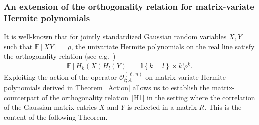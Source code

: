 \documentclass[AHL,Unicode,longabstracts,published]{cedram}
\newcommand{\clO}{\mathcal{O}}
\newcommand{\E}[1]{\mathbb{E}\left[#1\right]}
\newcommand{\ind}[1]{\mathbb{I}
\left\{#1\right\}}
\begin{document}
\subsubsection{An extension of the orthogonality relation for matrix-variate Hermite polynomials} 

It is well-known that for jointly standardized Gaussian random variables $X,Y$ such that $\E{XY}=\rho$, the univariate Hermite polynomials on the real line satisfy the orthogonality relation (see e.g.~\cite[Proposition~2.2.1]{NP12})
\begin{gather}\label{H1}
\E{H_k(X)H_l(Y)}=\ind{k=l} \times k! \rho^{k}.
\end{gather}
Exploiting the action of the operator $\clO_{t;A}^{(\ell,n)}$ on matrix-variate Hermite polynomials derived in Theorem~\ref{Action} allows us to establish the matrix-counterpart of the orthogonality relation~\eqref{H1} in the setting where the correlation of the Gaussian matrix entries $X$ and $Y$ is reflected in a matrix $R$. This is the content of the following Theorem.
\end{document}
